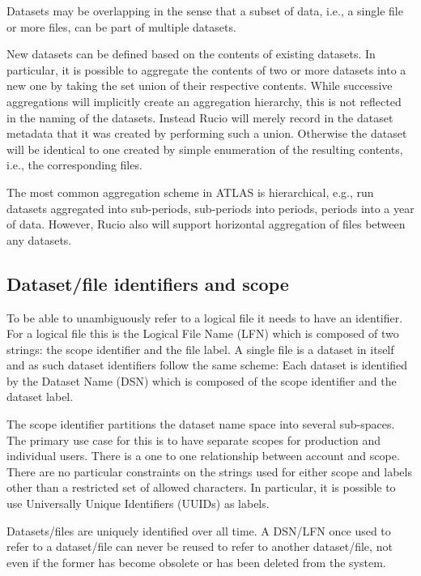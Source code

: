 \documentclass{atlasnote}
\begin{document}
Datasets may be overlapping in the sense that a subset of data, i.e.,
a single file or more files, can be part of multiple datasets.

New datasets can be defined based on the contents of existing
datasets. In particular, it is possible to aggregate the contents of
two or more datasets into a new one by taking the set union of their
respective contents. While successive aggregations will implicitly
create an aggregation hierarchy, this is not reflected in the naming
of the datasets. Instead Rucio will merely record in the dataset
metadata that it was created by performing such a union. Otherwise the
dataset will be identical to one created by simple enumeration of the
resulting contents, i.e., the corresponding files.

The most common aggregation scheme in ATLAS is hierarchical, e.g., run datasets
aggregated into sub-periods, sub-periods into periods, periods into
a year of data. However, Rucio also will support horizontal
aggregation of files between any datasets.


\subsection{Dataset/file identifiers and scope}
\label{overview_Dataset:dataset-file-identifiers-and-scope}

To be able to unambiguously refer to a logical file it needs to have
an identifier.  For a logical file this is the Logical File Name (LFN)
which is composed of two strings: the scope identifier and the file
label.  A
single file is a dataset in itself and as such dataset identifiers
follow the same scheme: Each dataset is identified by the Dataset Name (DSN)
 which is composed of the scope identifier and the dataset label.

The scope identifier partitions the dataset name space into several
sub-spaces. The primary use case for this is to have separate scopes
for production and individual users. There is a one to one
relationship between account and scope.  There are no particular
constraints on the strings used for either scope and labels other than
a restricted set of allowed characters. In particular, it is
possible to use Universally Unique Identifiers (UUIDs) as labels.

Datasets/files are uniquely identified over all time. A DSN/LFN once
used to refer to a dataset/file can never be reused to refer to
another dataset/file, not even if the former has become obsolete or
has been deleted from the system.
\end{document}
